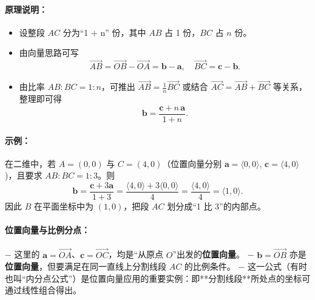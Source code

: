 \documentclass[8pt,a4paper,twoside]{tau-class/tau}
\begin{document}
\paragraph{原理说明：}
\begin{itemize}
  \item 设整段 \(AC\) 分为“1 + n” 份，其中 \(AB\) 占 1 份，\(BC\) 占 \(n\) 份。
  \item 由向量思路可写 
    \[
      \overrightarrow{AB} 
      = \overrightarrow{OB} − \overrightarrow{OA}
      = \mathbf{b} − \mathbf{a},
      \quad
      \overrightarrow{BC}
      = \mathbf{c} − \mathbf{b}.
    \]
  \item 由比率 \(AB:BC=1:n\)，可推出
    \(\overrightarrow{AB} = \tfrac{1}{n}\overrightarrow{BC}\) 或结合 \(\overrightarrow{AC} = \overrightarrow{AB} + \overrightarrow{BC}\) 等关系，整理即可得
    \[
      \mathbf{b} = \frac{\mathbf{c} + n\,\mathbf{a}}{1+n}.
    \]
\end{itemize}

\paragraph{示例：}
在二维中，若 \(A=(0,0)\) 与 \(C=(4,0)\)（位置向量分别 \(\mathbf{a}=\langle 0,0\rangle\), \(\mathbf{c}=\langle 4,0\rangle\))，且要求 \(AB:BC=1:3\)。则
\[
\mathbf{b}
= \frac{\mathbf{c} + 3\mathbf{a}}{1+3}
= \frac{\langle 4,0\rangle + 3\langle 0,0\rangle}{4}
= \frac{\langle 4,0\rangle}{4}
= \langle 1,0\rangle.
\]
因此 \(B\) 在平面坐标中为 \((1,0)\)，把段 \(AC\) 划分成“1 比 3”的内部点。

\paragraph{位置向量与比例分点：}
− 这里的 \(\mathbf{a}=\overrightarrow{OA}\)、\(\mathbf{c}=\overrightarrow{OC}\)，均是“从原点 \(O\)”出发的\textbf{位置向量}。
− \(\mathbf{b}=\overrightarrow{OB}\) 亦是\textbf{位置向量}，但要满足在同一直线上分割线段 \(AC\) 的比例条件。
− 这一公式（有时也叫“内分点公式”）是位置向量应用的重要实例：即**分割线段**所处点的坐标可通过线性组合得出。
\end{document}

